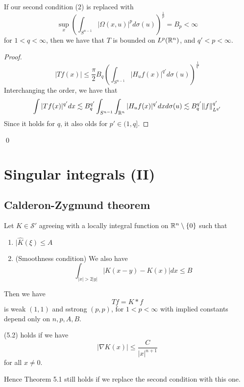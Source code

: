 \begin{note}
    If our second condition (2) is replaced with 
    \begin{equation*}
        \sup_x\left(\int_{S^{n-1}}|\Omega(x,u)|^pd\sigma(u)\right)^{\frac{1}{p}}=B_p<\infty
    \end{equation*}
    for $1<q<\infty$, then we have that $T$ is bounded on $L^p(\mathbb{R}^n)$, and $q'<p<\infty$.
\end{note}
\begin{proof}
    \begin{equation*}
        |Tf(x)|\leq\frac{\pi}{2}B_q\left(\int_{S^{n-1}}|H_uf(x)|^{q'}d\sigma(u)\right)^\frac{1}{q'}
    \end{equation*}
    Interchanging the order, we have that
    \begin{equation*}
        \int |Tf(x)|^{q'}dx\lesssim B_q^{q'}\int_{S^{n-1}}\int_{\mathbb{R}^n}|H_uf(x)|^{q'}dxd\sigma(u)\lesssim B_q^{q'}\|f\|_{L^{q'}}^{q'}
    \end{equation*}
    Since it holds for $q$, it also olds for $p'\in (1,q]$.
\end{proof}
\qed

\chapter{Singular integrals (II)}

\section{Calderon-Zygmund theorem}
\begin{theorem}
    Let $K\in\mathcal{S}'$ agreeing with a locally integral function on $\mathbb{R}^n\setminus\{0\}$ such that 
    \begin{enumerate}
        \item $|\hat{K}(\xi)\leq A$
        \item (Smoothness condition) We also have \begin{equation*}
            \int_{|x|>2|y|}|K(x-y)-K(x)|dx\leq B
        \end{equation*}
    \end{enumerate}
    Then we have 
    \begin{equation*}
        Tf=K\ast f
    \end{equation*}
    is weak $(1,1)$ and sstrong $(p,p)$, for $1<p<\infty$ with implied constants depend only on $n, p, A, B$.
\end{theorem}
\begin{proposition}
    (5.2) holds if we have
    \begin{equation*}
        |\nabla K(x)|\leq\frac{C}{|x|^{n+1}}
    \end{equation*}
    for all $x\neq 0$.
\end{proposition}
Hence Theorem 5.1 still holds if we replace the second condition with this one.


